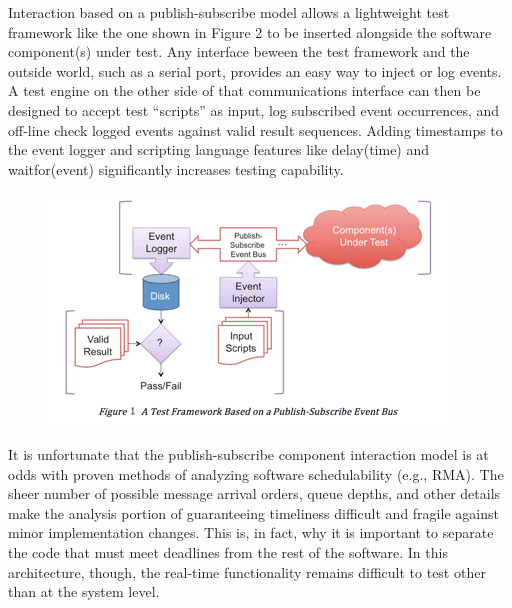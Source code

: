Interaction based on a publish-subscribe model allows a lightweight test framework like the one shown in Figure 2 to be inserted alongside the software component(s) under test. Any interface beween the test framework and the outside world, such as a serial port, provides an easy way to inject or log events. A test engine on the other side of that communications interface can then be designed to accept test “scripts” as input, log subscribed event occurrences, and off-line check logged events against valid result sequences. Adding timestamps to the event logger and scripting language features like delay(time) and waitfor(event) significantly increases testing capability.

\begin{figure}[h!]
\centering
\includegraphics[scale=0.8]{./images/testing_procedure}
\end{figure}

It is unfortunate that the publish-subscribe component interaction model is at odds with proven methods of analyzing software schedulability (e.g., RMA). The sheer number of possible message arrival orders, queue depths, and other details make the analysis portion of guaranteeing timeliness difficult and fragile against minor implementation changes. This is, in fact, why it is important to separate the code that must meet deadlines from the rest of the software. In this architecture, though, the real-time functionality remains difficult to test other than at the system level.